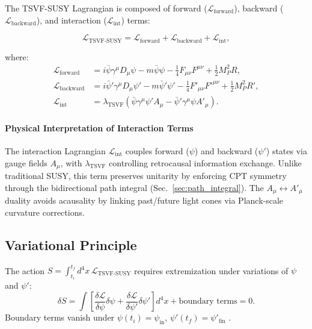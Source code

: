 \documentclass[twocolumn,superscriptaddress,floatfix]{revtex4-2}
\begin{document}
The TSVF-SUSY Lagrangian is composed of forward ($\mathcal{L}_{\text{forward}}$), backward ($\mathcal{L}_{\text{backward}}$), and interaction ($\mathcal{L}_{\text{int}}$) terms:  

\begin{equation}  
\mathcal{L}_{\text{TSVF-SUSY}} = \mathcal{L}_{\text{forward}} + \mathcal{L}_{\text{backward}} + \mathcal{L}_{\text{int}},  
\label{eq:lagrangian_total}   
\end{equation}  

where:  
\begin{equation}  
\begin{aligned}  
\mathcal{L}_{\text{forward}} &= i\bar{\psi}\gamma^\mu D_\mu\psi - m\bar{\psi}\psi  
                                - \tfrac{1}{4}F_{\mu\nu}F^{\mu\nu} + \tfrac{1}{2}M_P^2 R, \\[5pt]  
\mathcal{L}_{\text{backward}} &= i\bar{\psi}'\gamma^\mu D_\mu\psi' - m\bar{\psi}'\psi'  
                                - \tfrac{1}{4}F'_{\mu\nu}F'^{\mu\nu} + \tfrac{1}{2}M_P^2 R', \\[3pt]  
\mathcal{L}_{\text{int}} &= \lambda_{\text{TSVF}}\left(\bar{\psi}\gamma^\mu\psi' A_\mu  
                            - \bar{\psi}'\gamma^\mu\psi A'_\mu\right).  
\end{aligned}  
\label{eq:lagrangian_terms}   
\end{equation}  

\paragraph{Physical Interpretation of Interaction Terms}  
The interaction Lagrangian $\mathcal{L}_{\text{int}}$ couples forward ($\psi$) and backward ($\psi'$) states via gauge fields $A_\mu$, with $\lambda_{\text{TSVF}}$ controlling retrocausal information exchange. Unlike traditional SUSY, this term preserves unitarity by enforcing CPT symmetry through the bidirectional path integral (Sec.~\ref{sec:path_integral}). The $A_\mu \leftrightarrow A'_\mu$ duality avoids acausality by linking past/future light cones via Planck-scale curvature corrections.  

\subsection{Variational Principle}  
\label{subsec:variational}    

The action $S = \int_{t_i}^{t_f} d^4x\, \mathcal{L}_{\text{TSVF-SUSY}}$ requires extremization under variations of $\psi$ and $\psi'$:  
\begin{equation}  
\delta S = \int \left[\frac{\delta\mathcal{L}}{\delta\psi}\delta\psi + \frac{\delta\mathcal{L}}{\delta\psi'}\delta\psi'\right] d^4x + \text{boundary terms} = 0.  
\label{eq:action_variation}   
\end{equation}  
Boundary terms vanish under $\psi(t_i) = \psi_{\text{in}}$, $\psi'(t_f) = \psi'_{\text{fin}}$ \cite{Reuter1998}.  
\end{document}
